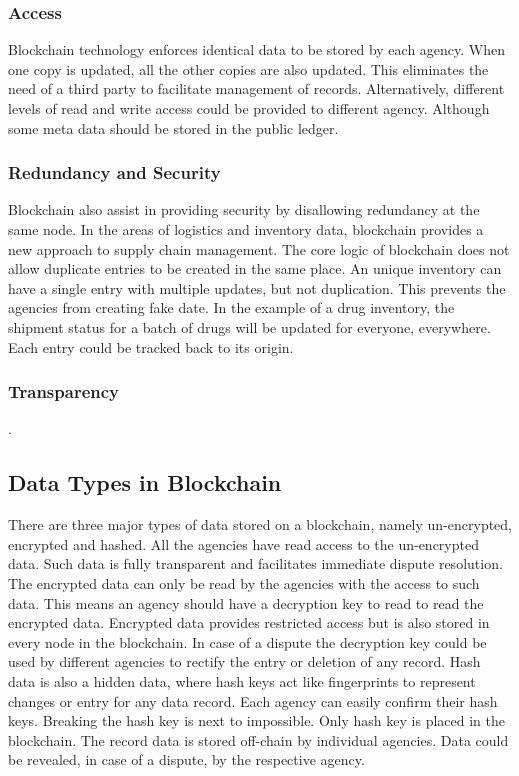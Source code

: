 \documentclass[sigconf]{acmart}
\begin{document}
\subsubsection{Access}
Blockchain technology enforces identical data to be stored by each agency. When one copy is updated, all the other copies are also updated. This eliminates the need of a third party to facilitate management of records\cite{arbc3}. Alternatively, different levels of read and write access could be provided to different agency. Although some meta data should be stored in the public ledger. 

\subsubsection{Redundancy and Security}
Blockchain also assist in providing security by disallowing redundancy at the same node. In the areas of logistics and inventory data, blockchain provides a new approach to supply chain management. The core logic of blockchain does not allow duplicate entries to be created in the same place\cite{arbc4}. An unique inventory can have a single entry with multiple updates, but not duplication. This prevents the agencies from creating fake date. In the example of a drug inventory, the shipment status for a batch of drugs will be updated for everyone, everywhere. Each entry could be tracked back to its origin\cite{arbc4}. 

\subsubsection{Transparency}
\cite{pabc1}.

\subsection{Data Types in Blockchain}
There are three major types of data stored on a blockchain, namely un-encrypted, encrypted and hashed\cite{arbc1}. All the agencies have read access to the un-encrypted data. Such data is fully transparent and facilitates immediate dispute resolution. The encrypted data can only be read by the agencies with the access to such data. This means an agency should have a decryption key to read to read the encrypted data. Encrypted data provides restricted access but is also stored in every node in the blockchain. In case of a dispute the decryption key could be used by different agencies to rectify the entry or deletion of any record. Hash data is also a hidden data, where hash keys act like fingerprints to represent changes or entry for any data record. Each agency can easily confirm their hash keys. Breaking the hash key is next to impossible. Only hash key is placed in the blockchain. The record data is stored off-chain by individual agencies. Data could be revealed, in case of a dispute, by the respective agency\cite{arbc1}.
\end{document}

